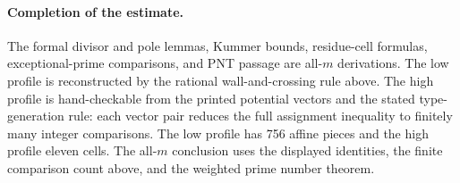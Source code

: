 \paragraph{Completion of the estimate.}
The formal divisor and pole lemmas, Kummer bounds, residue-cell formulas,
exceptional-prime comparisons, and PNT passage are all-$m$ derivations.
The low profile is reconstructed by the rational wall-and-crossing rule
above.  The high profile is hand-checkable from the printed potential vectors
and the stated type-generation rule: each vector pair reduces the full
assignment inequality to finitely many integer comparisons.  The low profile
has 756 affine pieces and the high profile eleven cells.  The all-$m$
conclusion uses the displayed identities, the finite comparison count above,
and the weighted prime number theorem.
